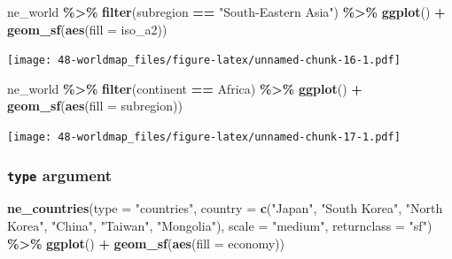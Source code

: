 \documentclass[
  xelatex, ja=standard]{bxjsbook}
\newenvironment{Shaded}{\begin{snugshade}}{\end{snugshade}}
\newcommand{\AttributeTok}[1]{\textcolor[rgb]{0.13,0.29,0.53}{#1}}
\newcommand{\FunctionTok}[1]{\textcolor[rgb]{0.13,0.29,0.53}{\textbf{#1}}}
\newcommand{\NormalTok}[1]{#1}
\newcommand{\SpecialCharTok}[1]{\textcolor[rgb]{0.81,0.36,0.00}{\textbf{#1}}}
\newcommand{\StringTok}[1]{\textcolor[rgb]{0.31,0.60,0.02}{#1}}
\theoremstyle{definition}
\theoremstyle{definition}
\theoremstyle{definition}
\theoremstyle{definition}
\theoremstyle{remark}
\begin{document}
\begin{Shaded}
\begin{Highlighting}[]
\NormalTok{ne\_world }\SpecialCharTok{\%\textgreater{}\%} \FunctionTok{filter}\NormalTok{(subregion }\SpecialCharTok{==} \StringTok{"South{-}Eastern Asia"}\NormalTok{) }\SpecialCharTok{\%\textgreater{}\%}
  \FunctionTok{ggplot}\NormalTok{() }\SpecialCharTok{+}   \FunctionTok{geom\_sf}\NormalTok{(}\FunctionTok{aes}\NormalTok{(}\AttributeTok{fill =}\NormalTok{ iso\_a2))}
\end{Highlighting}
\end{Shaded}

\texttt{[image: 48-worldmap\_files/figure-latex/unnamed-chunk-16-1.pdf]}

\begin{Shaded}
\begin{Highlighting}[]
\NormalTok{ne\_world }\SpecialCharTok{\%\textgreater{}\%} \FunctionTok{filter}\NormalTok{(continent }\SpecialCharTok{==} \StringTok{\textquotesingle{}Africa\textquotesingle{}}\NormalTok{) }\SpecialCharTok{\%\textgreater{}\%}
  \FunctionTok{ggplot}\NormalTok{() }\SpecialCharTok{+}   \FunctionTok{geom\_sf}\NormalTok{(}\FunctionTok{aes}\NormalTok{(}\AttributeTok{fill =}\NormalTok{ subregion))}
\end{Highlighting}
\end{Shaded}

\texttt{[image: 48-worldmap\_files/figure-latex/unnamed-chunk-17-1.pdf]}

\hypertarget{type-argument}{%
\subsubsection{\texorpdfstring{\texttt{type} argument}{type argument}}\label{type-argument}}

\begin{Shaded}
\begin{Highlighting}[]
\FunctionTok{ne\_countries}\NormalTok{(}\AttributeTok{type =} \StringTok{"countries"}\NormalTok{, }\AttributeTok{country =} \FunctionTok{c}\NormalTok{(}\StringTok{"Japan"}\NormalTok{, }\StringTok{"South Korea"}\NormalTok{, }\StringTok{"North Korea"}\NormalTok{, }\StringTok{"China"}\NormalTok{, }\StringTok{"Taiwan"}\NormalTok{, }\StringTok{"Mongolia"}\NormalTok{), }\AttributeTok{scale =} \StringTok{"medium"}\NormalTok{, }\AttributeTok{returnclass =} \StringTok{"sf"}\NormalTok{) }\SpecialCharTok{\%\textgreater{}\%}
  \FunctionTok{ggplot}\NormalTok{() }\SpecialCharTok{+} \FunctionTok{geom\_sf}\NormalTok{(}\FunctionTok{aes}\NormalTok{(}\AttributeTok{fill =}\NormalTok{ economy))}
\end{Highlighting}
\end{Shaded}
\end{document}

